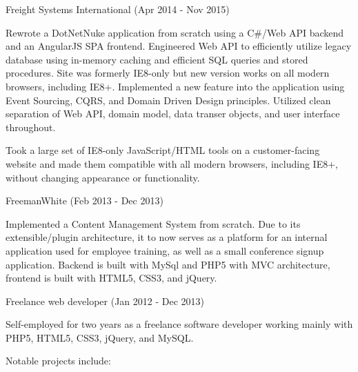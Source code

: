 \documentclass{article}
\begin{document}
    \noindent\makebox[\linewidth]{\rule{\textwidth}{0.4pt}}
    \medskip

    {
        \large
        Freight Systems International
        {
            \color{fade-gray}
            \small
            (Apr 2014 - Nov 2015)
        }
    }

    \medskip

    Rewrote a DotNetNuke application from scratch using a C\#/Web API backend and an AngularJS SPA frontend. Engineered Web API to efficiently utilize legacy database using in-memory caching and efficient SQL queries and stored procedures. Site was formerly IE8-only but new version works on all modern browsers, including IE8+. Implemented a new feature into the application using Event Sourcing, CQRS, and Domain Driven Design principles. Utilized clean separation of Web API, domain model, data transer objects, and user interface throughout.

    \smallskip

    Took a large set of IE8-only JavaScript/HTML tools on a customer-facing website and made them compatible with all modern browsers, including IE8+, without changing appearance or functionality.


    \bigskip\bigskip

    {
        \large
        FreemanWhite 
        {
            \color{fade-gray}
            \small
            (Feb 2013 - Dec 2013)
        }
    }

    \medskip

    Implemented a Content Management System from scratch. Due to its extensible/plugin architecture, it to now serves as a platform for an internal application used for employee training, as well as a small conference signup application. Backend is built with MySql and PHP5 with MVC architecture, frontend is built with HTML5, CSS3, and jQuery.


    \bigskip\bigskip

    {
        \large
        Freelance web developer 
        {
            \color{fade-gray}
            \small
            (Jan 2012 - Dec 2013)
        }
    }

    \medskip

    Self-employed for two years as a freelance software developer working mainly with PHP5, HTML5, CSS3, jQuery, and MySQL. 
    
    \smallskip

    Notable projects include:
\end{document}
